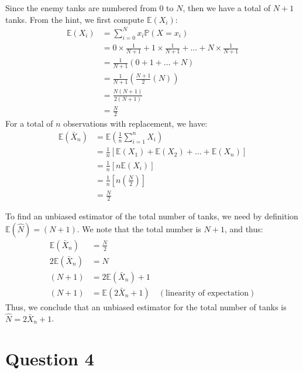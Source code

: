 \documentclass[12pt]{article}
\begin{document}
Since the enemy tanks are numbered from $0$ to $N$, then we have a total of $N+1$ tanks. From the hint, we first compute $ \mathbb{E}(X_i)$: \begin{align*}
    \mathbb{E}(X_i) &= \sum_{i=0}^{N} x_i \mathbb{P}(X = x_i) \\ 
    &= 0 \times \frac{1}{N+1} + 1 \times \frac{1}{N+1} + \dots + N \times \frac{1}{N+1} \\ 
    &= \frac{1}{N+1} (0 + 1 + \dots + N) \\ 
    &= \frac{1}{N+1}\left( \frac{N+1}{2}(N) \right) \\ 
    &= \frac{N(N+1)}{2(N+1)} \\ 
    &= \boxed{\frac{N}{2}}
\end{align*} For a total of $n$ observations with replacement, we have: \begin{align*}
    \mathbb{E}(\bar{X}_n) &= \mathbb{E}(\frac{1}{n} \sum_{i=1}^{n} X_i) \\ 
    &= \frac{1}{n}\left[ \mathbb{E}(X_{1}) + \mathbb{E}(X_{2}) + \dots + \mathbb{E}(X_n) \right] \\ 
    &= \frac{1}{n} \left[ n \mathbb{E}(X_i) \right] \\ 
    &= \frac{1}{n} \left[ n \left( \frac{N}{2} \right) \right] \\ 
    &= \boxed{\frac{N}{2}}
\end{align*}

\noindent To find an unbiased estimator of the total number of tanks, we need by definition $ \mathbb{E}(\hat{N}) = (N+1)$. We note that the total number is $N+1$, and thus: \begin{align*}
    \mathbb{E}(\bar{X}_n) &= \frac{N}{2} \\ 
    2 \mathbb{E}(\bar{X}_n) &= N \\ 
    (N+1) &= 2 \mathbb{E}(\bar{X}_n) + 1 \\ 
    (N+1) &= \boxed{\mathbb{E}(2 \bar{X}_n + 1)} \quad (\text{linearity of expectation})
\end{align*} Thus, we conclude that an unbiased estimator for the total number of tanks is $\hat{N} = 2 \bar{X}_n + 1$. 

\newpage

\section*{Question 4}
\end{document}
